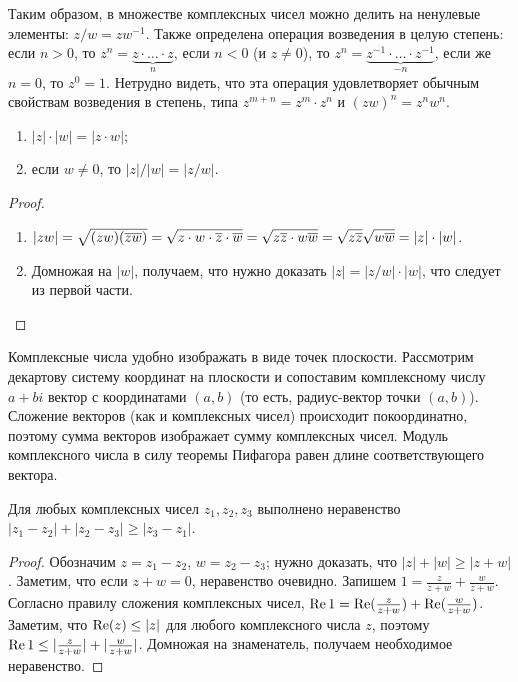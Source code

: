\begin{remark}
Таким образом, в множестве комплексных чисел можно делить на ненулевые
элементы: $z/w=zw^{-1}$. Также определена операция возведения в целую
степень: если $n>0$, то $z^n=\underbrace{z\cdot\dots\cdot z}_{n}$,
если $n<0$ (и $z\neq 0$), то $z^n=\underbrace{z^{-1}\cdot\dots\cdot z^{-1}}_{-n}$,
если же $n=0$, то $z^0=1$. Нетрудно видеть, что эта операция
удовлетворяет обычным свойствам возведения в степень, типа
$z^{m+n}=z^m\cdot z^n$ и $(zw)^n=z^nw^n$.
\end{remark}

\begin{proposition}\label{prop_abs_properties}
\hspace{1em}
\begin{enumerate}
\item $|z|\cdot |w|=|z\cdot w|$;
\item если $w\neq 0$, то $|z|/|w|=|z/w|$.
\end{enumerate}
\end{proposition}
\begin{proof}
\begin{enumerate}
\item $|zw|=\sqrt{(zw)(\overline{zw})}
=\sqrt{z\cdot w\cdot\overline{z}\cdot\overline{w}}
=\sqrt{z\overline{z}\cdot w\overline{w}}=\sqrt{z\overline{z}}\sqrt{w\overline{w}}
=|z|\cdot|w|$.
\item Домножая на $|w|$, получаем, что нужно доказать $|z|=|z/w|\cdot
  |w|$, что следует из первой части.
\end{enumerate}
\end{proof}

\begin{remark}
Комплексные числа удобно изображать в виде точек плоскости. Рассмотрим
декартову систему координат на плоскости и сопоставим комплексному
числу $a+bi$ вектор с координатами $(a,b)$ (то есть, радиус-вектор
точки $(a,b)$). Сложение векторов (как и комплексных чисел) происходит
покоординатно, поэтому сумма векторов изображает сумму комплексных
чисел. Модуль комплексного числа в силу теоремы Пифагора равен длине
соответствующего вектора.
\end{remark}

\begin{proposition}
Для любых комплексных чисел $z_1,z_2,z_3$ выполнено неравенство
$|z_1-z_2|+|z_2-z_3|\geq |z_3-z_1|$.
\end{proposition}
\begin{proof}
Обозначим $z=z_1-z_2$, $w=z_2-z_3$; нужно доказать, что $|z|+|w|\geq
|z+w|$. Заметим, что если $z+w=0$, неравенство очевидно.
Запишем $1=\frac{z}{z+w}+\frac{w}{z+w}$. Согласно правилу сложения
комплексных чисел,
$\operatorname{Re}{1}=\operatorname{Re}(\frac{z}{z+w})+\operatorname{Re}(\frac{w}{z+w})$. Заметим, что
$\operatorname{Re}(z)\leq |z|$ для любого комплексного числа $z$, поэтому
$\operatorname{Re}{1}\leq |\frac{z}{z+w}|+|\frac{w}{z+w}|$. Домножая на
знаменатель, получаем необходимое неравенство.
\end{proof}


